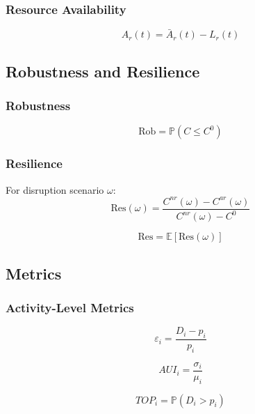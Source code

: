 \subsubsection{Resource Availability}
\begin{equation}
A_r(t) = \bar{A}_r(t) - L_r(t)
\end{equation}

\subsection{Robustness and Resilience}

\subsubsection{Robustness}
\begin{equation}
\mathrm{Rob} = \mathbb{P}(C \le C^0)
\end{equation}

\subsubsection{Resilience}
For disruption scenario $\omega$:
\begin{equation}
\mathrm{Res}(\omega) =
\frac{C^{nr}(\omega) - C^{ar}(\omega)}
{C^{nr}(\omega) - C^0}
\end{equation}

\begin{equation}
\mathrm{Res} = \mathbb{E}[\mathrm{Res}(\omega)]
\end{equation}

\subsection{Metrics}

\subsubsection{Activity-Level Metrics}

\begin{equation}
\varepsilon_i = \frac{D_i - p_i}{p_i}
\end{equation}

\begin{equation}
AUI_i = \frac{\sigma_i}{\mu_i}
\end{equation}

\begin{equation}
TOP_i = \mathbb{P}(D_i > p_i)
\end{equation}

